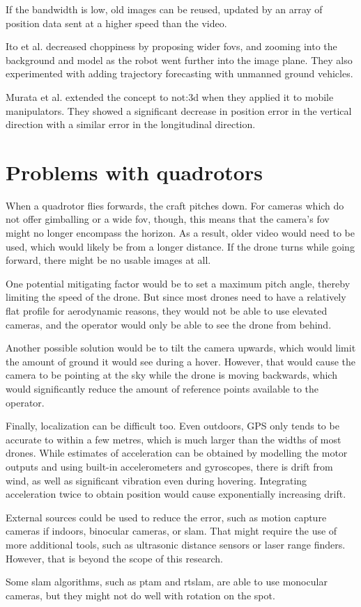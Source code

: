 If the bandwidth is low, old images can be reused, updated by an array of position data sent at a higher speed than the video.

Ito et al. decreased choppiness by proposing wider \glspl{fov}, and zooming into the background and model as the robot went further into the image plane.\cite{ito2008}
They also experimented with adding trajectory forecasting with unmanned ground vehicles.

Murata et al. extended the concept to \gls{not:3d} when they applied it to mobile manipulators.\cite{murata2014}
They showed a significant decrease in position error in the vertical direction with a similar error in the longitudinal direction.

\section{Problems with quadrotors}
When a quadrotor flies forwards, the craft pitches down.
For cameras which do not offer gimballing or a wide \gls{fov}, though, this means that the camera's \gls{fov} might no longer encompass the horizon.
As a result, older video would need to be used, which would likely be from a longer distance.
If the drone turns while going forward, there might be no usable images at all.

One potential mitigating factor would be to set a maximum pitch angle, thereby limiting the speed of the drone.
But since most drones need to have a relatively flat profile for aerodynamic reasons, they would not be able to use elevated cameras, and the operator would only be able to see the drone from behind.

Another possible solution would be to tilt the camera upwards, which would limit the amount of ground it would see during a hover.
However, that would cause the camera to be pointing at the sky while the drone is moving backwards, which would significantly reduce the amount of reference points available to the operator.

Finally, localization can be difficult too.
Even outdoors, GPS only tends to be accurate to within a few metres, which is much larger than the widths of most drones.
While estimates of acceleration can be obtained by modelling the motor outputs and using built-in accelerometers and gyroscopes, there is drift from wind, as well as significant vibration even during hovering.
Integrating acceleration twice to obtain position would cause exponentially increasing drift.

External sources could be used to reduce the error, such as motion capture cameras if indoors, binocular cameras, or \gls{slam}.
That might require the use of more additional tools, such as ultrasonic distance sensors or laser range finders.
However, that is beyond the scope of this research.

Some \gls{slam} algorithms, such as \gls{ptam} and \gls{rtslam}, are able to use monocular cameras, but they might not do well with rotation on the spot.
